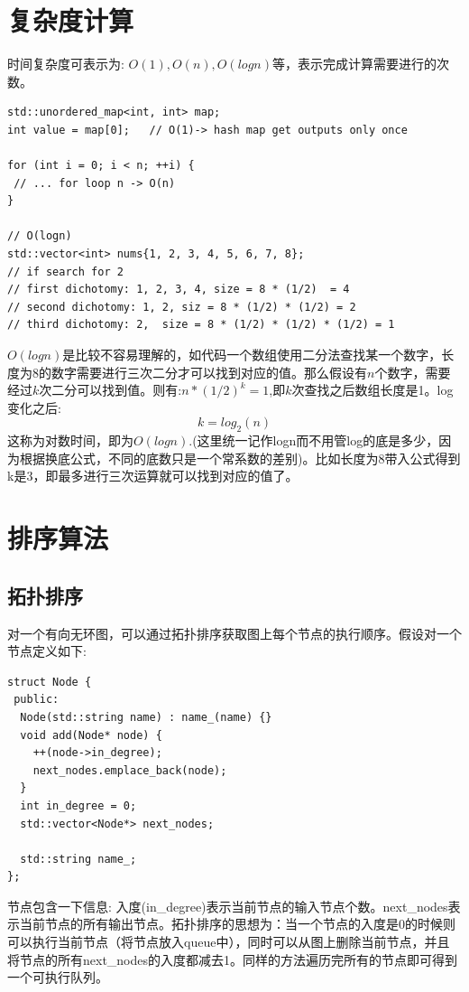 \documentclass[12pt]{book}
\begin{document}
\section{复杂度计算}
时间复杂度可表示为: $O(1), O(n), O(logn)$等，表示完成计算需要进行的次数。
\begin{lstlisting}
std::unordered_map<int, int> map;
int value = map[0];   // O(1)-> hash map get outputs only once

for (int i = 0; i < n; ++i) {
 // ... for loop n -> O(n)
}

// O(logn)
std::vector<int> nums{1, 2, 3, 4, 5, 6, 7, 8};
// if search for 2
// first dichotomy: 1, 2, 3, 4, size = 8 * (1/2)  = 4
// second dichotomy: 1, 2, siz = 8 * (1/2) * (1/2) = 2
// third dichotomy: 2,  size = 8 * (1/2) * (1/2) * (1/2) = 1
\end{lstlisting}
$O(logn)$是比较不容易理解的，如代码一个数组使用二分法查找某一个数字，长度为8的数字需要进行三次二分才可以找到对应的值。那么假设有$n$个数字，需要经过$k$次二分可以找到值。则有:$n * (1/2)^k = 1$,即$k$次查找之后数组长度是1。log变化之后:
\begin{equation}\label{log-algorithm-time}
k = log_2(n)
\end{equation}
这称为对数时间，即为$O(logn)$.(这里统一记作logn而不用管log的底是多少，因为根据换底公式，不同的底数只是一个常系数的差别)。比如长度为8带入公式得到k是3，即最多进行三次运算就可以找到对应的值了。

\section{排序算法}
\subsection{拓扑排序}
对一个有向无环图，可以通过拓扑排序获取图上每个节点的执行顺序。假设对一个节点定义如下:
\begin{lstlisting}
struct Node {
 public:
  Node(std::string name) : name_(name) {}
  void add(Node* node) {
	++(node->in_degree);
	next_nodes.emplace_back(node);
  }
  int in_degree = 0;
  std::vector<Node*> next_nodes;
	
  std::string name_;
};
\end{lstlisting}
节点包含一下信息: 入度(in\_degree)表示当前节点的输入节点个数。next\_nodes表示当前节点的所有输出节点。拓扑排序的思想为：当一个节点的入度是0的时候则可以执行当前节点（将节点放入queue中），同时可以从图上删除当前节点，并且将节点的所有next\_nodes的入度都减去1。同样的方法遍历完所有的节点即可得到一个可执行队列。
\end{document}
